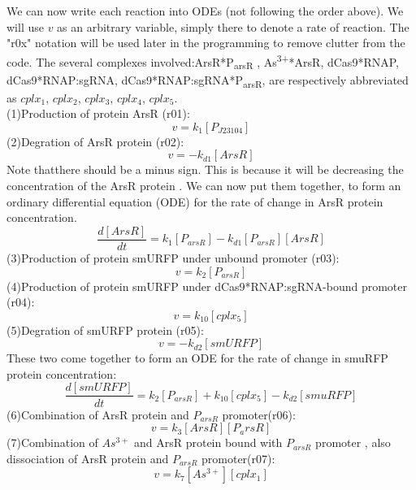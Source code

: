 We can now write each reaction into ODEs (not following the order above). We will use $v$ as an arbitrary variable, simply there to denote a rate of reaction. The "r0x" notation will be used later in the programming to remove clutter from the code. The several complexes involved:ArsR*P\textsubscript{arsR} , As\textsuperscript{3+}*ArsR, dCas9*RNAP, dCas9*RNAP:sgRNA, dCas9*RNAP:sgRNA*P\textsubscript{arsR}, are respectively abbreviated as $cplx_1$, $cplx_2$, $cplx_3$, $cplx_4$, $cplx_5$.\\
(1)Production of protein ArsR (r01):
\begin{displaymath}
v=k_1[P_{J23104}]
\end{displaymath}
(2)Degration of ArsR protein (r02):
\begin{displaymath}
v=-k_{d1}[ArsR]
\end{displaymath}
Note thatthere should be a minus sign. This is because it will be decreasing the concentration of the ArsR protein . We can now put them together, to form an ordinary differential equation (ODE) for the rate of change in ArsR protein concentration.
\begin{equation}
\frac{d[ArsR]}{dt}=k_1[P_{arsR}]-k_{d1}[P_{arsR}][ArsR]\tag{1}
\end{equation}
(3)Production of protein smURFP under unbound promoter (r03):
\begin{displaymath}
v=k_2[P_{arsR}]
\end{displaymath}
(4)Production of protein smURFP under dCas9*RNAP:sgRNA-bound promoter (r04):
\begin{displaymath}
v=k_{10}[cplx_5]
\end{displaymath}
(5)Degration of smURFP protein (r05):
\begin{displaymath}
v=-k_{d2}[smURFP]
\end{displaymath}
These two come together to form an ODE for the rate of change in smuRFP protein concentration:
\begin{equation}
\frac{d[smURFP]}{dt}=k_2[P_{arsR}]+k_{10}[cplx_5]-k_{d2}[smuRFP]\tag{2}
\end{equation}
(6)Combination of ArsR protein and $P_{arsR}$ promoter(r06):
\begin{displaymath}
v=k_3[ArsR][P_arsR]
\end{displaymath}
(7)Combination of $As^{3+}$ and ArsR protein bound with $P_{arsR}$ promoter , also dissociation of ArsR protein and $P_{arsR}$ promoter(r07):
\begin{displaymath}
v=k_7[As^{3+}][cplx_1]
\end{displaymath}
